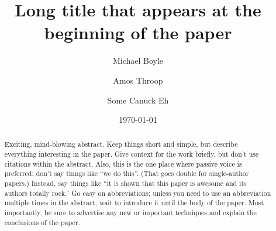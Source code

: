 \documentclass[reprint, aps, prd, letterpaper, noshowpacs, amsmath, %
amssymb, amsfonts, nofootinbib, floatfix, superscriptaddress, %
twoside]{revtex4-1}
\begin{document}

\graphicspath{%
  {Plots/}%
}

\title[Short title appearing in subsequent headers] {Long title that
  appears at the beginning of the paper}

\makeatletter
\@booleantrue\frontmatterverbose@sw
\makeatother

\author{Michael Boyle} \Cornell
\author{Amos Throop} \Caltech
\author{Some Canuck Eh} \CITA

\date{\today}

\begin{abstract}
  Exciting, mind-blowing abstract.  Keep things short and simple, but
  describe everything interesting in the paper.  Give context for the
  work briefly, but don't use citations within the abstract.  Also,
  this is the one place where passive voice is preferred; don't say
  things like ``we do this''.  (That goes double for single-author
  papers.)  Instead, say things like ``it is shown that this paper is
  awesome and its authors totally rock.''  Go easy on abbreviations;
  unless you need to use an abbreviation multiple times in the
  abstract, wait to introduce it until the body of the paper.  Most
  importantly, be sure to advertise any new or important techniques
  and explain the conclusions of the paper.
\end{abstract}



\maketitle
\end{document}
